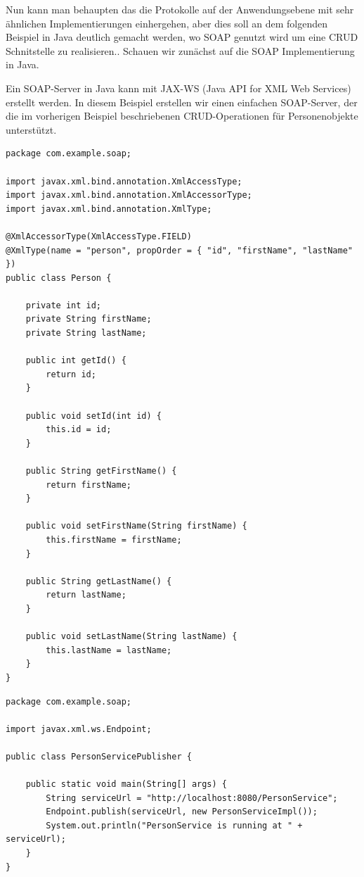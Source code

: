 Nun kann man behaupten das die Protokolle auf der Anwendungsebene mit sehr ähnlichen Implementierungen einhergehen, aber dies soll an dem folgenden Beispiel in Java deutlich gemacht werden, wo SOAP genutzt wird um eine CRUD Schnitstelle zu realisieren.. 
Schauen wir zunächst auf die SOAP Implementierung in Java. 

Ein SOAP-Server in Java kann mit JAX-WS (Java API for XML Web Services) erstellt werden. In diesem Beispiel erstellen wir einen einfachen SOAP-Server, der die im vorherigen Beispiel beschriebenen CRUD-Operationen für Personenobjekte unterstützt.\\
\noindent\begin{minipage}{\textwidth}
\begin{lstlisting}[caption={SOAP Class Person},captionpos=b,label={lst:soap_person}]
package com.example.soap;

import javax.xml.bind.annotation.XmlAccessType;
import javax.xml.bind.annotation.XmlAccessorType;
import javax.xml.bind.annotation.XmlType;

@XmlAccessorType(XmlAccessType.FIELD)
@XmlType(name = "person", propOrder = { "id", "firstName", "lastName" })
public class Person {

    private int id;
    private String firstName;
    private String lastName;

    public int getId() {
        return id;
    }

    public void setId(int id) {
        this.id = id;
    }

    public String getFirstName() {
        return firstName;
    }

    public void setFirstName(String firstName) {
        this.firstName = firstName;
    }

    public String getLastName() {
        return lastName;
    }

    public void setLastName(String lastName) {
        this.lastName = lastName;
    }
}
\end{lstlisting}
\end{minipage}

\noindent\begin{minipage}{\textwidth}
\begin{lstlisting}[caption={SOAP Person Service Publisher},captionpos=b,label={lst:soap_person_publish}]
package com.example.soap;

import javax.xml.ws.Endpoint;

public class PersonServicePublisher {

    public static void main(String[] args) {
        String serviceUrl = "http://localhost:8080/PersonService";
        Endpoint.publish(serviceUrl, new PersonServiceImpl());
        System.out.println("PersonService is running at " + serviceUrl);
    }
}
\end{lstlisting}
\end{minipage}

